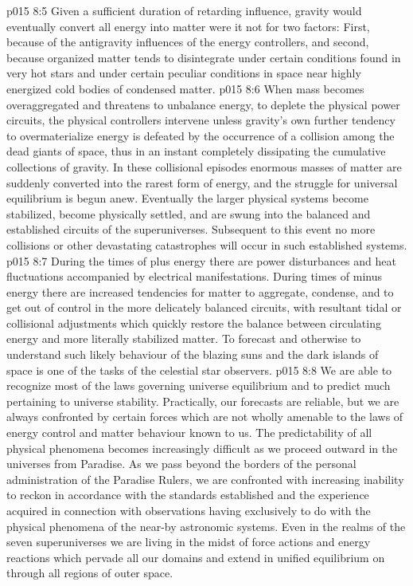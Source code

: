 \vs p015 8:5 Given a sufficient duration of retarding influence, gravity would eventually convert all energy into matter were it not for two factors: First, because of the antigravity influences of the energy controllers, and second, because organized matter tends to disintegrate under certain conditions found in very hot stars and under certain peculiar conditions in space near highly energized cold bodies of condensed matter.
\vs p015 8:6 When mass becomes overaggregated and threatens to unbalance energy, to deplete the physical power circuits, the physical controllers intervene unless gravity’s own further tendency to overmaterialize energy is defeated by the occurrence of a collision among the dead giants of space, thus in an instant completely dissipating the cumulative collections of gravity. In these collisional episodes enormous masses of matter are suddenly converted into the rarest form of energy, and the struggle for universal equilibrium is begun anew. Eventually the larger physical systems become stabilized, become physically settled, and are swung into the balanced and established circuits of the superuniverses. Subsequent to this event no more collisions or other devastating catastrophes will occur in such established systems.
\vs p015 8:7 During the times of plus energy there are power disturbances and heat fluctuations accompanied by electrical manifestations. During times of minus energy there are increased tendencies for matter to aggregate, condense, and to get out of control in the more delicately balanced circuits, with resultant tidal or collisional adjustments which quickly restore the balance between circulating energy and more literally stabilized matter. To forecast and otherwise to understand such likely behaviour of the blazing suns and the dark islands of space is one of the tasks of the celestial star observers.
\vs p015 8:8 We are able to recognize most of the laws governing universe equilibrium and to predict much pertaining to universe stability. Practically, our forecasts are reliable, but we are always confronted by certain forces which are not wholly amenable to the laws of energy control and matter behaviour known to us. The predictability of all physical phenomena becomes increasingly difficult as we proceed outward in the universes from Paradise. As we pass beyond the borders of the personal administration of the Paradise Rulers, we are confronted with increasing inability to reckon in accordance with the standards established and the experience acquired in connection with observations having exclusively to do with the physical phenomena of the near\hyp{}by astronomic systems. Even in the realms of the seven superuniverses we are living in the midst of force actions and energy reactions which pervade all our domains and extend in unified equilibrium on through all regions of outer space.
